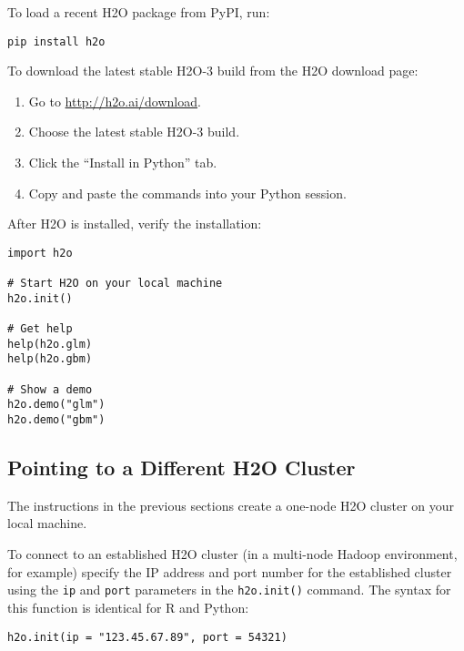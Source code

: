 To load a recent H2O package from PyPI, run:

\begin{lstlisting}[style=python]
pip install h2o
\end{lstlisting}

To download the
latest stable H2O-3 build from the H2O download page:

\begin{enumerate}
\item Go to {\url{http://h2o.ai/download}}.
\item Choose the latest stable H2O-3 build.
\item Click the ``Install in Python'' tab.
\item Copy and paste the commands into your Python session.
\end{enumerate}

\bigskip
After H2O is installed, verify the installation:

\begin{lstlisting}[style=python]
import h2o

# Start H2O on your local machine
h2o.init()

# Get help
help(h2o.glm)
help(h2o.gbm)

# Show a demo
h2o.demo("glm")
h2o.demo("gbm")

\end{lstlisting}

\subsection{Pointing to a Different H2O Cluster}

The instructions in the previous sections create a one-node H2O cluster on your local machine. 

To connect to an established H2O cluster (in a multi-node Hadoop environment, for example) specify the IP address and port number for the established cluster using the \texttt{ip} and \texttt{port} parameters in the \texttt{h2o.init()} command.  The syntax for this function is identical for R and Python:
\medskip  

\begin{lstlisting}[style=R]
h2o.init(ip = "123.45.67.89", port = 54321)
\end{lstlisting}


